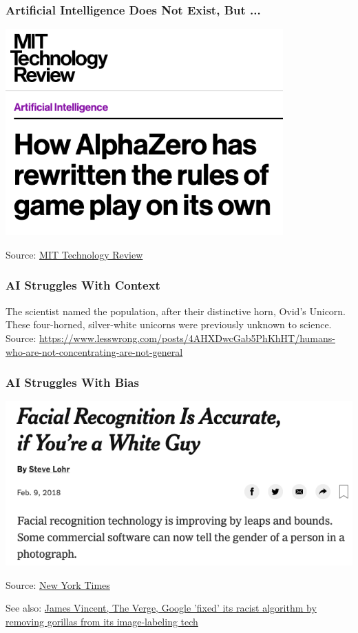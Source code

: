 \begin{frame}
\frametitle{Artificial Intelligence Does Not Exist, But ...}
\includegraphics[width=0.8\textwidth]{figures/alpha_go}

Source: \href{https://www.technologyreview.com/s/612923/how-alphazero-has-rewritten-the-rules-of-gameplay-on-its-own/}{MIT Technology Review}
\end{frame}

\begin{frame}
\frametitle{AI Struggles With Context}
The scientist named the population, after their distinctive horn, Ovid’s Unicorn. These four-horned, silver-white unicorns were previously unknown to science.
Source: \href{https://www.lesswrong.com/posts/4AHXDwcGab5PhKhHT/humans-who-are-not-concentrating-are-not-general}{https://www.lesswrong.com/posts/4AHXDwcGab5PhKhHT/humans-who-are-not-concentrating-are-not-general}
\end{frame}

\begin{frame}
\frametitle{AI Struggles With Bias}
\includegraphics[width=\textwidth]{figures/facial_bias}

Source: \href{https://www.nytimes.com/2018/02/09/technology/facial-recognition-race-artificial-intelligence.html}{New York Times}

See also: \href{https://www.theverge.com/2018/1/12/16882408/google-racist-gorillas-photo-recognition-algorithm-ai}{James Vincent, The Verge, Google 'fixed' its racist algorithm by removing gorillas from its image-labeling tech}
\end{frame}


